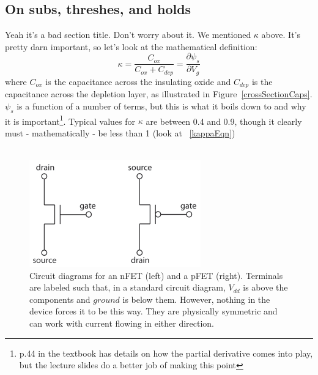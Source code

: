 \subsection{On subs, threshes, and holds}
Yeah it's a bad section title. Don't worry about it. We mentioned $\kappa$ above. It's pretty darn important, so let's look at the mathematical definition:
\begin{equation}
\kappa = \frac{C_{ox}}{C_{ox} + C_{dep}} = \frac{\partial\psi_s}{\partial V_g}
\label{kappaEqn}
\end{equation}
where $C_{ox}$ is the capacitance across the insulating oxide and $C_{dep}$ is the capacitance across the depletion layer, as illustrated in Figure~\ref{crossSectionCaps}. $\psi_s$ is a function of a number of terms, but this is what it boils down to and why it is important\footnote{p.44 in the textbook has details on how the partial derivative comes into play, but the lecture slides do a better job of making this point}. Typical values for $\kappa$ are between 0.4 and 0.9, though it clearly must - mathematically - be less than 1 (look at ~\eqref{kappaEqn}) \\ \\
\begin{figure}[ht]
\includegraphics[natwidth=560,natheight=350]{pics/nme_mosfets.pdf}
\caption{Circuit diagrams for an nFET (left) and a pFET (right). Terminals are labeled such that, in a standard circuit diagram, $V_{dd}$ is above the components and $ground$ is below them. However, nothing in the device forces it to be this way. They are physically symmetric and can work with current flowing in either direction. \label{mosfetsFig}}
\end{figure}
